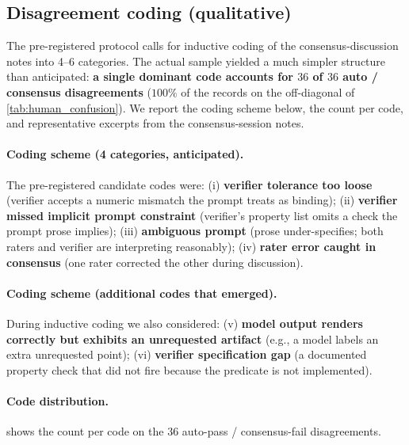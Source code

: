 \subsection{Disagreement coding (qualitative)}
\label{app:human_study:disagreement_coding}

The pre-registered protocol calls for inductive coding of the consensus-discussion notes into 4--6 categories.
The actual sample yielded a much simpler structure than anticipated: \textbf{a single dominant code accounts for $36$ of $36$ auto / consensus disagreements} ($100\%$ of the records on the off-diagonal of \cref{tab:human_confusion}).
We report the coding scheme below, the count per code, and representative excerpts from the consensus-session notes.

\paragraph{Coding scheme (4 categories, anticipated).}
The pre-registered candidate codes were:
(i) \textbf{verifier tolerance too loose} (verifier accepts a numeric mismatch the prompt treats as binding);
(ii) \textbf{verifier missed implicit prompt constraint} (verifier's property list omits a check the prompt prose implies);
(iii) \textbf{ambiguous prompt} (prose under-specifies; both raters and verifier are interpreting reasonably);
(iv) \textbf{rater error caught in consensus} (one rater corrected the other during discussion).

\paragraph{Coding scheme (additional codes that emerged).}
During inductive coding we also considered:
(v) \textbf{model output renders correctly but exhibits an unrequested artifact} (e.g., a model labels an extra unrequested point);
(vi) \textbf{verifier specification gap} (a documented property check that did not fire because the predicate is not implemented).

\paragraph{Code distribution.}
 shows the count per code on the $36$ auto-pass / consensus-fail disagreements.

